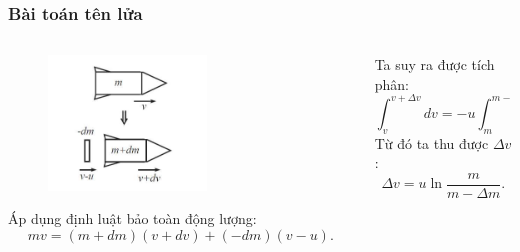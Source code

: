 \begin{frame}
\frametitle{Bài toán tên lửa}
\begin{columns}
\begin{column}{0.5\textwidth}
\begin{figure}
    \centering
    \includegraphics[width=0.6\textwidth]{Content/Figure/rocketsolving.png}
\end{figure}
Áp dụng định luật bảo toàn động lượng:
\begin{equation*}
    mv = (m+ dm)(v+dv) + (-dm)(v-u).
\end{equation*}
\end{column}
\begin{column}{0.5\textwidth}
    Ta suy ra được tích phân:
    \begin{equation}
        \int_{v}^{v+\Delta v} dv =- u \int_{m}^{m-\Delta m} \frac{dm}{m}.
    \end{equation}
    Từ đó ta thu được \(\Delta v\):
    \begin{equation}
        \Delta v = u \ln{\frac{m}{m-\Delta m}}.
    \end{equation}
\end{column}
\end{columns}
\end{frame}